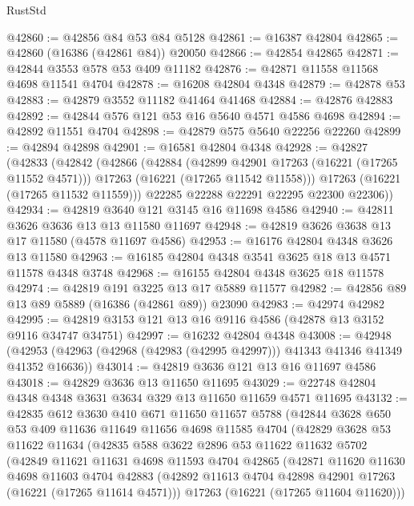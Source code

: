 \begin{lexlean}{RustStd}
\begin{coremodule}
@42860 := @42856 @84 @53 @84 @5128
@42861 := @16387 @42804
@42865 := @42860 (@16386 (@42861 @84)) @20050
@42866 := @42854 @42865
@42871 := @42844 @3553 @578 @53 @409 @11182
@42876 := @42871 @11558 @11568 @4698 @11541 @4704
@42878 := @16208 @42804 @4348
@42879 := @42878 @53
@42883 := @42879 @3552 @11182 @41464 @41468
@42884 := @42876 @42883
@42892 := @42844 @576 @121 @53 @16 @5640 @4571 @4586 @4698
@42894 := @42892 @11551 @4704
@42898 := @42879 @575 @5640 @22256 @22260
@42899 := @42894 @42898
@42901 := @16581 @42804 @4348
@42928 := @42827
    (@42833
      (@42842
        (@42866
          (@42884
            (@42899 @42901 @17263 (@16221 (@17265 @11552 @4571)))
            @17263
            (@16221 (@17265 @11542 @11558)))
          @17263
          (@16221 (@17265 @11532 @11559)))
        @22285
        @22288
        @22291
        @22295
        @22300
        @22306))
@42934 := @42819 @3640 @121 @3145 @16 @11698 @4586
@42940 := @42811 @3626 @3636 @13 @13 @11580 @11697
@42948 := @42819 @3626 @3638 @13 @17 @11580 (@4578 @11697 @4586)
@42953 := @16176 @42804 @4348 @3626 @13 @11580
@42963 := @16185 @42804 @4348 @3541 @3625 @18 @13 @4571 @11578 @4348 @3748
@42968 := @16155 @42804 @4348 @3625 @18 @11578
@42974 := @42819 @191 @3225 @13 @17 @5889 @11577
@42982 := @42856 @89 @13 @89 @5889 (@16386 (@42861 @89)) @23090
@42983 := @42974 @42982
@42995 := @42819 @3153 @121 @13 @16 @9116 @4586 (@42878 @13 @3152 @9116 @34747 @34751)
@42997 := @16232 @42804 @4348
@43008 := @42948
    (@42953 (@42963 (@42968 (@42983 (@42995 @42997))) @41343 @41346 @41349 @41352 @16636))
@43014 := @42819 @3636 @121 @13 @16 @11697 @4586
@43018 := @42829 @3636 @13 @11650 @11695
@43029 := @22748 @42804 @4348 @4348 @3631 @3634 @329 @13 @11650 @11659 @4571 @11695
@43132 := @42835
    @612
    @3630
    @410
    @671
    @11650
    @11657
    @5788
    (@42844
      @3628
      @650
      @53
      @409
      @11636
      @11649
      @11656
      @4698
      @11585
      @4704
      (@42829
        @3628
        @53
        @11622
        @11634
        (@42835
          @588
          @3622
          @2896
          @53
          @11622
          @11632
          @5702
          (@42849
            @11621
            @11631
            @4698
            @11593
            @4704
            @42865
            (@42871
              @11620
              @11630
              @4698
              @11603
              @4704
              @42883
              (@42892 @11613 @4704 @42898 @42901 @17263 (@16221 (@17265 @11614 @4571)))
              @17263
              (@16221 (@17265 @11604 @11620)))

\end{coremodule}
\end{lexlean}
